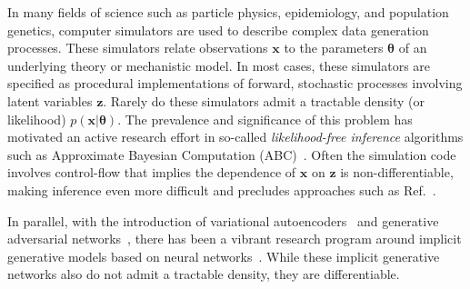 \documentclass[twocolumn,superscriptaddress,aps]{revtex4-1}
\newcommand{\kcnote}[1]{\textcolor{red}{[KC: #1]}}
\newcommand{\bftheta}{{\bm \theta}}
\newcommand{\bfx}{\mathbf{x}}
\newcommand{\bfz}{\mathbf{z}}
\theoremstyle{plain}
\begin{document}
In many fields of science such as particle physics, epidemiology,  and population
genetics, computer simulators are used to describe complex data generation processes. These simulators relate 
observations $\bfx$ to the parameters $\bftheta$ of an underlying theory or mechanistic model. 
In most cases, these simulators are specified as procedural implementations of forward, stochastic processes involving latent variables $\bfz$.
Rarely do these simulators admit a tractable density (or likelihood) $p(\bfx | \bftheta)$. The prevalence and significance of this problem has motivated an active research effort in so-called \textit{likelihood-free inference} algorithms such as Approximate Bayesian Computation (ABC)~\cite{beaumont2002approximate, marjoram2003markov, sisson2007sequential, sisson2011likelihood, marin2012approximate, cranmer2015approximating}. 
Often the simulation code involves control-flow that implies the dependence of $\bfx$ on $\bfz$ is non-differentiable, making inference even more difficult and precludes approaches such as Ref.~\citep{2016arXiv160507826G}. 




In parallel, with the introduction of variational autoencoders~\citep{DBLP:journals/corr/KingmaW13} and generative adversarial networks~\cite{goodfellow2014generative}, there has been a vibrant research program around implicit generative models based on neural networks~\citep{2016arXiv161003483M}.  While these implicit generative networks also do not admit a tractable density, they are differentiable. 


\end{document}
